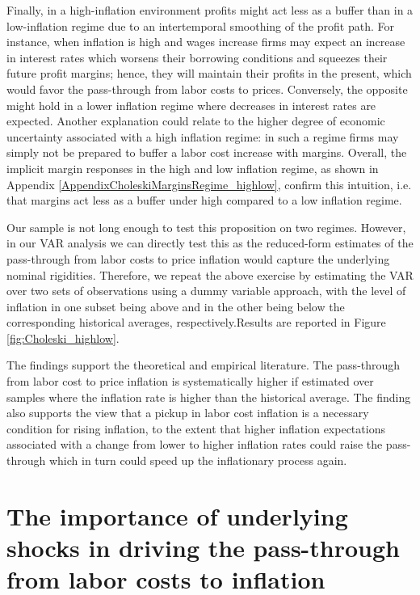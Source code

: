 \documentclass[11pt]{article}
\begin{document}
Finally, in a high-inflation environment profits might act less as a buffer than in a low-inflation regime due to an intertemporal smoothing of the profit path. For instance, when inflation is high and wages increase firms may expect an increase in interest rates which worsens their borrowing conditions and squeezes their future profit margins; hence, they will maintain their profits in the present, which would favor the pass-through from labor costs to prices. Conversely, the opposite might hold in a lower inflation regime where decreases in interest rates are expected. Another explanation could relate to the higher degree of economic uncertainty associated with a high inflation regime: in such a regime firms may simply not be prepared to buffer a labor cost increase with margins. Overall, the implicit margin responses in the high and low inflation regime, as shown in  Appendix \ref{AppendixCholeskiMarginsRegime_highlow}, confirm this intuition, i.e. that margins act less as a buffer under high compared to a low inflation regime.

Our sample is not long enough to test this proposition on two regimes. However, in our VAR analysis we can directly test this as the reduced-form estimates of the pass-through from labor costs to price inflation would capture the underlying nominal rigidities. Therefore, we repeat the above exercise by estimating the VAR over two sets of observations using a dummy variable approach, with the level of inflation in one subset being above and in the other being below the corresponding historical averages, respectively.Results are reported in Figure \ref{fig:Choleski_highlow}.

The findings support the theoretical and empirical literature. The pass-through from labor cost to price inflation is systematically higher if estimated over samples where the inflation rate is higher than the historical average. The finding also supports the view that a pickup in labor cost inflation is a necessary condition for rising inflation, to the extent that higher inflation expectations associated with a change from lower to higher inflation rates could raise the pass-through which in turn could speed up the inflationary process again.
\pagebreak


\section{The importance of underlying shocks in driving the pass-through from labor costs to inflation}
\label{Section:SVAR}
\end{document}
